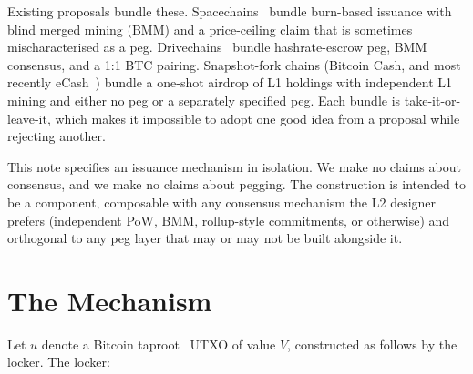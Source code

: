 \documentclass[11pt,a4paper]{article}
\begin{document}
\noindent Existing proposals bundle these. Spacechains~\cite{spacechain} bundle burn-based issuance with blind merged mining (BMM) and a price-ceiling claim that is sometimes mischaracterised as a peg. Drivechains~\cite{bip300,bip301} bundle hashrate-escrow peg, BMM consensus, and a 1:1 BTC pairing. Snapshot-fork chains (Bitcoin Cash, and most recently eCash~\cite{ecash}) bundle a one-shot airdrop of L1 holdings with independent L1 mining and either no peg or a separately specified peg. Each bundle is take-it-or-leave-it, which makes it impossible to adopt one good idea from a proposal while rejecting another.

This note specifies an issuance mechanism in isolation. We make no claims about consensus, and we make no claims about pegging. The construction is intended to be a component, composable with any consensus mechanism the L2 designer prefers (independent PoW, BMM, rollup-style commitments, or otherwise) and orthogonal to any peg layer that may or may not be built alongside it.
\fi


\section{The Mechanism}
\label{sec:mechanism}

Let $u$ denote a Bitcoin taproot~\cite{bip341} UTXO of value $V$, constructed as follows by the locker. The locker:
\end{document}
